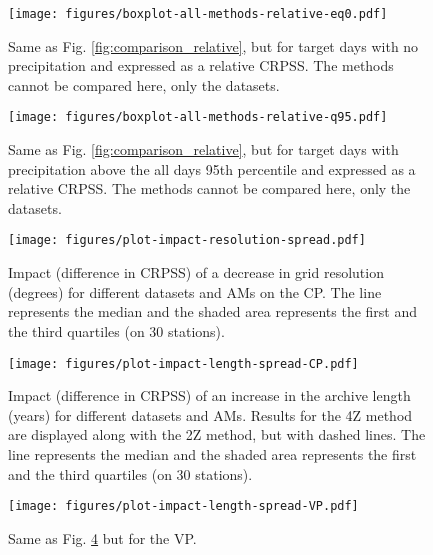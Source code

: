 \documentclass{ametsoc}
\begin{document}
\begin{figure}[t]
	\noindent\texttt{[image: figures/boxplot-all-methods-relative-eq0.pdf]}\\
	\caption{Same as Fig. \ref{fig:comparison_relative}, but for target days with no precipitation and expressed as a relative CRPSS. The methods cannot be compared here, only the datasets.}
	\label{fig:comparison_relative_P0}
\end{figure}

\begin{figure}[t]
	\noindent\texttt{[image: figures/boxplot-all-methods-relative-q95.pdf]}\\
	\caption{Same as Fig. \ref{fig:comparison_relative}, but for target days with precipitation above the all days 95th percentile and expressed as a relative CRPSS. The methods cannot be compared here, only the datasets.}
	\label{fig:comparison_relative_Pq95}
\end{figure}

\begin{figure}[t]
	\noindent\texttt{[image: figures/plot-impact-resolution-spread.pdf]}\\
	\caption{Impact (difference in CRPSS) of a decrease in grid resolution (degrees) for different datasets and AMs on the CP. The line represents the median and the shaded area represents the first and the third quartiles (on 30 stations).}
	\label{fig:plot_impact_resolution}
\end{figure}

\begin{figure}[t]
	\noindent\texttt{[image: figures/plot-impact-length-spread-CP.pdf]}\\
	\caption{Impact (difference in CRPSS) of an increase in the archive length (years) for different datasets and AMs. Results for the 4Z method are displayed along with the 2Z method, but with dashed lines. The line represents the median and the shaded area represents the first and the third quartiles (on 30 stations).}
	\label{fig:plot_impact_length_CP}
\end{figure}

\begin{figure}[t]
	\noindent\texttt{[image: figures/plot-impact-length-spread-VP.pdf]}\\
	\caption{Same as Fig. \ref{fig:plot_impact_length_CP} but for the VP.}
	\label{fig:plot_impact_length_VP}
\end{figure}
\end{document}
